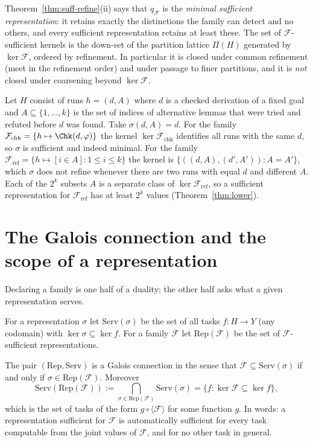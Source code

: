 Theorem~\ref{thm:suff-refine}(ii) says that $q_{\mathcal F}$ is the \emph{minimal sufficient representation}: it retains exactly the distinctions the family can detect and no others, and every sufficient representation retains at least these. The set of $\mathcal F$-sufficient kernels is the down-set of the partition lattice $\Pi(H)$ generated by $\ker\mathcal F$, ordered by refinement. In particular it is closed under common refinement (meet in the refinement order) and under passage to finer partitions, and it is \emph{not} closed under coarsening beyond $\ker\mathcal F$.

\begin{example}
\label{ex:deriv-rep}
Let $H$ consist of runs $h=(d,A)$ where $d$ is a checked derivation of a fixed goal and $A\subseteq\{1,\dots,k\}$ is the set of indices of alternative lemmas that were tried and refuted before $d$ was found. Take $\sigma(d,A)=d$. For the family $\mathcal F_{\mathrm{chk}}=\{h\mapsto\Chk(d,\varphi)\}$ the kernel $\ker\mathcal F_{\mathrm{chk}}$ identifies all runs with the same $d$, so $\sigma$ is sufficient and indeed minimal. For the family $\mathcal F_{\mathrm{ref}}=\{h\mapsto[i\in A]:1\le i\le k\}$ the kernel is $\{((d,A),(d',A')): A=A'\}$, which $\sigma$ does not refine whenever there are two runs with equal $d$ and different $A$. Each of the $2^k$ subsets $A$ is a separate class of $\ker\mathcal F_{\mathrm{ref}}$, so a sufficient representation for $\mathcal F_{\mathrm{ref}}$ has at least $2^k$ values (Theorem~\ref{thm:lower}).
\end{example}

\section{The Galois connection and the scope of a representation}

Declaring a family is one half of a duality; the other half asks what a given representation serves.

\begin{definition}
\label{def:galois}
For a representation $\sigma$ let $\mathrm{Serv}(\sigma)$ be the set of all tasks $f:H\to Y$ (any codomain) with $\ker\sigma\subseteq\ker f$. For a family $\mathcal F$ let $\mathrm{Rep}(\mathcal F)$ be the set of $\mathcal F$-sufficient representations.
\end{definition}

\begin{theorem}
\label{thm:closure}
The pair $(\mathrm{Rep},\mathrm{Serv})$ is a Galois connection in the sense that $\mathcal F\subseteq\mathrm{Serv}(\sigma)$ if and only if $\sigma\in\mathrm{Rep}(\mathcal F)$. Moreover
\[
\mathrm{Serv}(\mathrm{Rep}(\mathcal F)):=\bigcap_{\sigma\in\mathrm{Rep}(\mathcal F)}\mathrm{Serv}(\sigma)=\{f:\ker\mathcal F\subseteq\ker f\},
\]
which is the set of tasks of the form $g\circ\langle\mathcal F\rangle$ for some function $g$. In words: a representation sufficient for $\mathcal F$ is automatically sufficient for every task computable from the joint values of $\mathcal F$, and for no other task in general.
\end{theorem}


